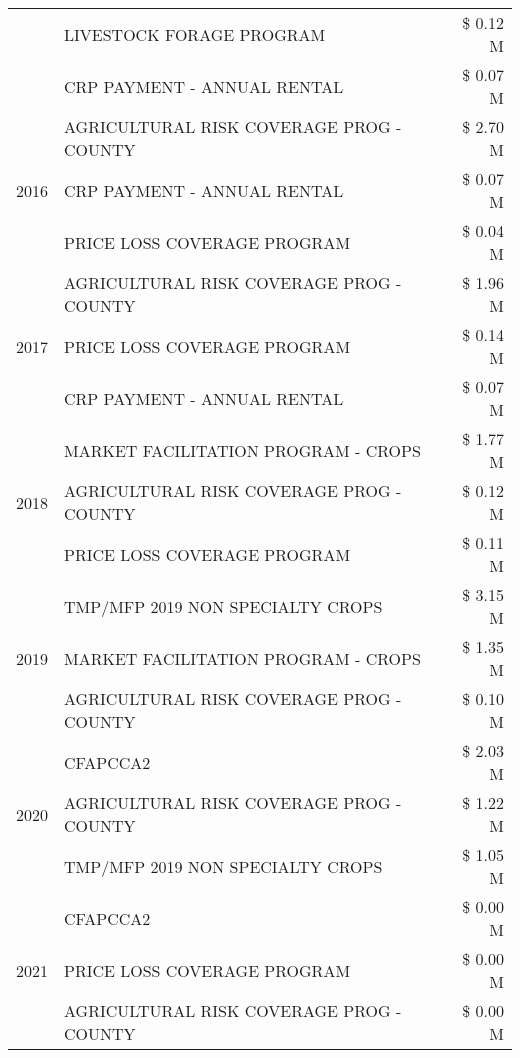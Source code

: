 \begin{tabular}{llr}
 & LIVESTOCK FORAGE PROGRAM & \$ 0.12 M \\
 & CRP PAYMENT - ANNUAL RENTAL & \$ 0.07 M \\
\cline{1-3}
\multirow[t]{3}{*}{2016} & AGRICULTURAL RISK COVERAGE PROG - COUNTY & \$ 2.70 M \\
 & CRP PAYMENT - ANNUAL RENTAL & \$ 0.07 M \\
 & PRICE LOSS COVERAGE PROGRAM & \$ 0.04 M \\
\cline{1-3}
\multirow[t]{3}{*}{2017} & AGRICULTURAL RISK COVERAGE PROG - COUNTY & \$ 1.96 M \\
 & PRICE LOSS COVERAGE PROGRAM & \$ 0.14 M \\
 & CRP PAYMENT - ANNUAL RENTAL & \$ 0.07 M \\
\cline{1-3}
\multirow[t]{3}{*}{2018} & MARKET FACILITATION PROGRAM - CROPS & \$ 1.77 M \\
 & AGRICULTURAL RISK COVERAGE PROG - COUNTY & \$ 0.12 M \\
 & PRICE LOSS COVERAGE PROGRAM & \$ 0.11 M \\
\cline{1-3}
\multirow[t]{3}{*}{2019} & TMP/MFP 2019 NON SPECIALTY CROPS & \$ 3.15 M \\
 & MARKET FACILITATION PROGRAM - CROPS & \$ 1.35 M \\
 & AGRICULTURAL RISK COVERAGE PROG - COUNTY & \$ 0.10 M \\
\cline{1-3}
\multirow[t]{3}{*}{2020} & CFAPCCA2 & \$ 2.03 M \\
 & AGRICULTURAL RISK COVERAGE PROG - COUNTY & \$ 1.22 M \\
 & TMP/MFP 2019 NON SPECIALTY CROPS & \$ 1.05 M \\
\cline{1-3}
\multirow[t]{3}{*}{2021} & CFAPCCA2 & \$ 0.00 M \\
 & PRICE LOSS COVERAGE PROGRAM & \$ 0.00 M \\
 & AGRICULTURAL RISK COVERAGE PROG - COUNTY & \$ 0.00 M \\
\cline{1-3}
\bottomrule
\end{tabular}
